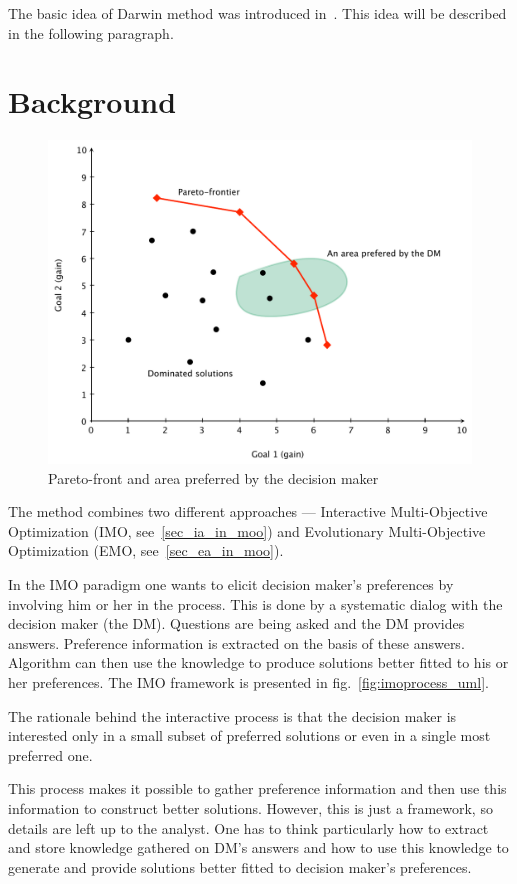The basic idea of Darwin method was introduced in~\cite{GMS09}. This idea will
be described in the following paragraph.

\section{Background}

\begin{figure}
  \centering \includegraphics[scale=0.65]{img/pareto}
  \caption{Pareto-front and area preferred by the decision maker}
  \label{pareto}
\end{figure}

The method combines two different approaches --- Interactive Multi-Objective
Optimization (IMO, see~\ref{sec_ia_in_moo}) and Evolutionary Multi-Objective
Optimization (EMO, see~\ref{sec_ea_in_moo}).

In the IMO paradigm one wants to elicit decision maker's preferences by
involving him or her in the process. This is done by a systematic dialog with
the decision maker (the DM). Questions are being asked and the DM provides
answers. Preference information is extracted on the basis of these
answers. Algorithm can then use the knowledge to produce solutions better
fitted to his or her preferences. The IMO framework is presented in
fig.~\ref{fig:imoprocess_uml}.

The rationale behind the interactive process is that the decision maker is
interested only in a small subset of preferred solutions or even in a single
most preferred one.

This process makes it possible to gather preference information and then use
this information to construct better solutions. However, this is just a
framework, so details are left up to the analyst. One has to think
particularly how to extract and store knowledge gathered on DM's answers and
how to use this knowledge to generate and provide solutions better fitted to
decision maker's preferences.

